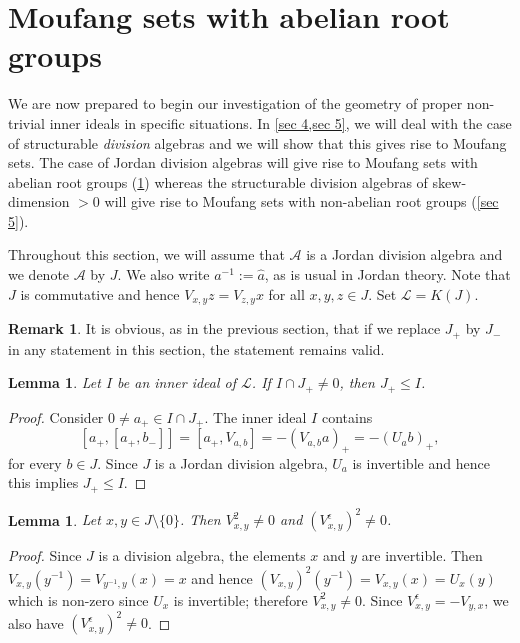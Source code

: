 \documentclass[oneside,a4paper]{amsart} %
\newtheorem{lemma}[theorem]{Lemma}
\theoremstyle{definition}
\newtheorem{remark}[theorem]{Remark}
\newcommand{\A}{\mathcal{A}}
\newcommand{\LL}{\mathcal{L}}
\numberwithin{equation}{section}
\begin{document}
\section{Moufang sets with abelian root groups}
\label{sec 4}

We are now prepared to begin our investigation of the geometry of proper non-trivial inner ideals in specific situations. In \cref{sec 4,sec 5}, we will deal with the case of structurable \textit{division} algebras and we will show that this gives rise to Moufang sets.
The case of Jordan division algebras will give rise to Moufang sets with abelian root groups (\cref{sec 4}) whereas the structurable division algebras of skew-dimension $>0$ will give rise to Moufang sets with non-abelian root groups (\cref{sec 5}).

Throughout this section, we will assume that $\A$ is a Jordan division algebra and we denote $\A$ by $J$. 
We also write $a^{-1} := \hat a$, as is usual in Jordan theory.
Note that $J$ is commutative and hence $V_{x,y}z=V_{z,y}x$ for all $x,y,z \in J$.
Set $\LL=K(J)$.
\begin{remark}
	It is obvious, as in the previous section, that if we replace $J_+$ by $J_-$ in any statement in this section, the statement remains valid.
\end{remark}

\begin{lemma}
\label{JordanInner}
	Let $I$ be an inner ideal of $\LL$. 
	If $I\cap J_+\neq 0$, then $J_+\leq I$.
\end{lemma}
\begin{proof}
	Consider $0\neq a_+\in I\cap J_+$. 
	The inner ideal $I$ contains
	\[ [a_+,[a_+,b_-]] = [a_+,V_{a,b}] = -(V_{a,b}a)_+ = -(U_a b)_+, \]
	for every $b\in J$.
	Since $J$ is a Jordan division algebra, $U_a$ is invertible and hence this implies $J_+\leq I$.
\end{proof}

\begin{lemma}
\label{V zero}
	Let $x,y\in J \setminus \{ 0 \}$. 
	Then $V_{x,y}^2\neq 0$ and $(V_{x,y}^\epsilon)^2 \neq 0$.
\end{lemma}
\begin{proof}
	Since $J$ is a division algebra, the elements $x$ and $y$ are invertible.
	Then $V_{x,y}(y^{-1})=V_{y^{-1},y}(x)=x$ and hence $(V_{x,y})^2(y^{-1})=V_{x,y}(x)=U_x(y)$ which is non-zero since $U_x$ is invertible; therefore $V_{x,y}^2 \neq 0$.
	Since $V_{x,y}^\epsilon=-V_{y,x}$, we also have $(V_{x,y}^\epsilon)^2 \neq 0$.
\end{proof}
\end{document}
